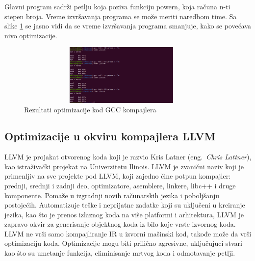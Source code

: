 \documentclass[a4paper]{article}
\begin{document}
Glavni program sadrži petlju koja poziva funkciju powern, koja računa n-ti stepen broja. Vreme izvršavanja programa se može meriti naredbom time. Sa slike \ref{fig:Rezultati_optimizacije} se jasno vidi da se vreme izvršavanja programa smanjuje, kako se povećava nivo optimizacije.

\begin{figure}[h!]
    \begin{center}
        \includegraphics[width=105mm, height=30mm]{pics/test.png}
    \end{center}
    \caption {Rezultati optimizacije kod GCC kompajlera}
    \label{fig:Rezultati_optimizacije}

\end{figure}


\subsection{Optimizacije u okviru kompajlera LLVM}
\label{subsec:optimizacijeLLVM}

LLVM je projakat otvorenog koda koji je razvio Kris Latner (eng.~{\em Chris Lattner}), kao istraživački projekat na Univerzitetu Ilinois. LLVM je zvanični naziv koji je primenljiv na sve projekte pod LLVM, koji zajedno čine potpun kompajler: prednji, srednji i zadnji deo, optimizatore, asemblere, linkere, libc++ i druge komponente. Pomaže u izgradnji novih računarskih jezika i poboljšanju postojećih. Automatizuje teške i neprijatne zadatke koji su uključeni u kreiranje jezika, kao što je prenos izlaznog koda na više platformi i arhitektura, LLVM je zapravo okvir za generisanje objektnog koda iz bilo koje vrste izvornog koda. LLVM ne vrši samo kompajliranje IR u izvorni mašinski kod, takođe može da vrši optimizaciju koda. Optimizacije mogu biti prilično agresivne, uključujuci stvari kao što su umetanje funkcija, eliminisanje mrtvog koda i odmotavanje petlji. \cite{llvm1} \cite{gccVsClang}
\end{document}
